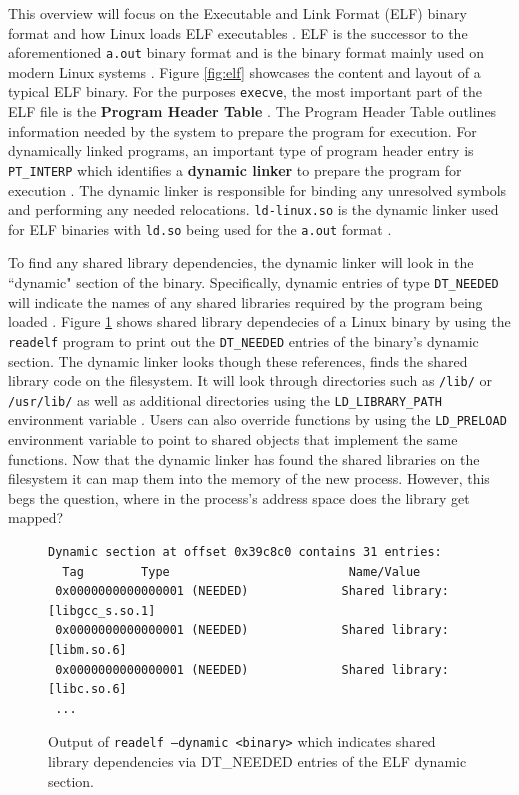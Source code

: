 \documentclass[12pt]{ucsddissertation}
\begin{document}
This overview will focus on the Executable and Link Format (ELF) binary format and how Linux loads ELF executables \cite{elf-pdf}. ELF is the successor to the aforementioned \texttt{a.out} binary format and is the binary format mainly used on modern Linux systems \cite{lwm-elf}. Figure \ref{fig:elf} showcases the content and layout of a typical ELF binary. For the purposes \texttt{execve}, the most important part of the ELF file is the \textbf{Program Header Table} \cite{program-header-table}. The Program Header Table outlines information needed by the system to prepare the program for execution. For dynamically linked programs, an important type of program header entry is \texttt{PT\_INTERP} which identifies a \textbf{dynamic linker} to prepare the program for execution \cite{lwm-elf, program-header-table}. The dynamic linker is responsible for binding any unresolved symbols and performing any needed relocations. \texttt{ld-linux.so} is the dynamic linker used for ELF binaries with \texttt{ld.so} being used for the \texttt{a.out} format \cite{ld-so}. 


To find any shared library dependencies, the dynamic linker will look in the ``dynamic" section of the binary. Specifically, dynamic entries of type \texttt{DT\_NEEDED} will indicate the names of any shared libraries required by the program being loaded \cite{elf-pdf, lwm-dynamic}. Figure \ref{fig:dt_needed} shows shared library dependecies of a Linux binary by using the \texttt{readelf} program to print out the \texttt{DT\_NEEDED} entries of the binary's dynamic section. The dynamic linker looks though these references, finds the shared library code on the filesystem. It will look through directories such as \texttt{/lib/} or \texttt{/usr/lib/} as well as additional directories using the \texttt{LD\_LIBRARY\_PATH} environment variable \cite{ld-so}. Users can also override functions by using the \texttt{LD\_PRELOAD} environment variable to point to shared objects that implement the same functions. Now that the dynamic linker has found the shared libraries on the filesystem it can map them into the memory of the new process. However, this begs the question, where in the process's address space does the library get mapped? 

\begin{figure}
\begin{verbatim}
Dynamic section at offset 0x39c8c0 contains 31 entries:
  Tag        Type                         Name/Value
 0x0000000000000001 (NEEDED)             Shared library: [libgcc_s.so.1]
 0x0000000000000001 (NEEDED)             Shared library: [libm.so.6]
 0x0000000000000001 (NEEDED)             Shared library: [libc.so.6]
 ...
\end{verbatim}
    \caption[DT\_NEEDED Entries of ELF Dynamic Section]{Output of \texttt{readelf --dynamic <binary>} which indicates shared library dependencies via DT\_NEEDED entries of the ELF dynamic section.}
\label{fig:dt_needed}
\end{figure}
\end{document}
